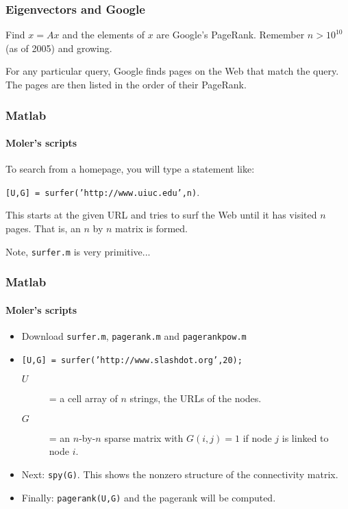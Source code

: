 \documentclass[10pt]{beamer}
\begin{document}
\begin{frame}
\frametitle{Eigenvectors and Google}

Find $x = Ax$ and the elements of $x$ are Google's PageRank.
Remember $n > 10^{10}$ (as of 2005) and growing.
\bigskip
\bigskip

For any particular query, Google finds pages on the Web that match
the query.  The pages are then listed in the order of their
PageRank.
\end{frame}
\begin{frame}
\frametitle{Matlab}
\framesubtitle{Moler's scripts}
To search from a homepage, you will type a statement like:
\bigskip

\texttt{[U,G] = surfer('http://www.uiuc.edu',n)}.
\bigskip

This starts at the given URL and tries to surf the Web until it
has visited $n$ pages.  That is, an $n$ by $n$ matrix is formed.
\bigskip

Note, \texttt{surfer.m} is very primitive...
\end{frame}
\begin{frame}
\frametitle{Matlab}
\framesubtitle{Moler's scripts}
\begin{itemize}
  \item Download \texttt{surfer.m}, \texttt{pagerank.m} and \texttt{pagerankpow.m}

  \item \texttt{[U,G] = surfer('http://www.slashdot.org',20);}
  \begin{description}
    \item[$U$] = a cell array of $n$ strings, the URLs of the nodes.
    \item[$G$]= an $n$-by-$n$ sparse matrix with $G(i,j)=1$ if node $j$
    is linked to node $i$.
  \end{description}
  \item Next: \texttt{spy(G)}.  This shows the nonzero
structure of the connectivity matrix.
  \item Finally: \texttt{pagerank(U,G)} and the pagerank will
be computed.
\end{itemize}
\end{frame}
\end{document}
